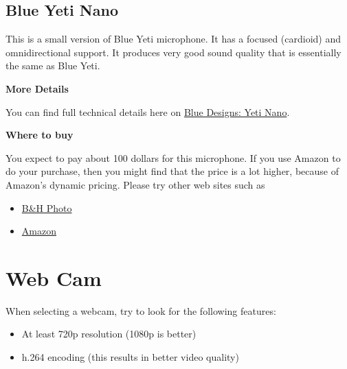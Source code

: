 \begin{gram}
\end{gram}

\subsection{Blue Yeti Nano}
\label{sec:equipment::blueyetinano}

\begin{gram}
\label{grm:equipment::blueyetinano::main}
%
This is a small version of Blue Yeti microphone.
%
It has a focused (cardioid) and omnidirectional support.
%
It produces very good sound quality that is essentially the same as Blue Yeti.


\textbf{More Details}

You can find full technical details here on \href{https://www.bluedesigns.com/products/yeti-nano/}{Blue Designs: Yeti Nano}.


\textbf{Where to buy}

You expect to pay about 100 dollars for this microphone.  If you use Amazon to do your purchase, then you might find that the price is a lot higher, because of Amazon's dynamic pricing.  Please try other web sites such as 

\begin{itemize}
\item
\href{https://www.bhphotovideo.com/c/l-search?q=Blue%20Yeti%20Nano&N=0}{B\&H Photo}
\item 
\href{https://www.amazon.com/Blue-Yeti-Premium-Recording-Streaming/dp/B07DTTGZ7M}{Amazon}
\end{itemize}
\end{gram}

\begin{gram}
\end{gram}

\section{Web Cam}
\label{sec:equipment::web-cam}

\begin{gram}[Features]
When selecting a webcam, try to look for the following features:

\begin{itemize}
	\item At least 720p resolution (1080p is better)
	\item h.264 encoding (this results in better video quality)
\end{itemize}
\end{gram}

